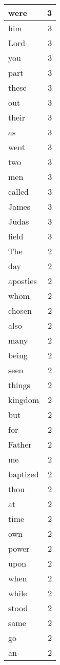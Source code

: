 \begin{center}
\begin{longtable}{l|r}
were & 3 \\ \hline
him & 3 \\ \hline
Lord & 3 \\ \hline
you & 3 \\ \hline
part & 3 \\ \hline
these & 3 \\ \hline
out & 3 \\ \hline
their & 3 \\ \hline
as & 3 \\ \hline
went & 3 \\ \hline
two & 3 \\ \hline
men & 3 \\ \hline
called & 3 \\ \hline
James & 3 \\ \hline
Judas & 3 \\ \hline
field & 3 \\ \hline
The & 2 \\ \hline
day & 2 \\ \hline
apostles & 2 \\ \hline
whom & 2 \\ \hline
chosen & 2 \\ \hline
also & 2 \\ \hline
many & 2 \\ \hline
being & 2 \\ \hline
seen & 2 \\ \hline
things & 2 \\ \hline
kingdom & 2 \\ \hline
but & 2 \\ \hline
for & 2 \\ \hline
Father & 2 \\ \hline
me & 2 \\ \hline
baptized & 2 \\ \hline
thou & 2 \\ \hline
at & 2 \\ \hline
time & 2 \\ \hline
own & 2 \\ \hline
power & 2 \\ \hline
upon & 2 \\ \hline
when & 2 \\ \hline
while & 2 \\ \hline
stood & 2 \\ \hline
same & 2 \\ \hline
go & 2 \\ \hline
an & 2 \\ \hline

\end{longtable}
\end{center}
